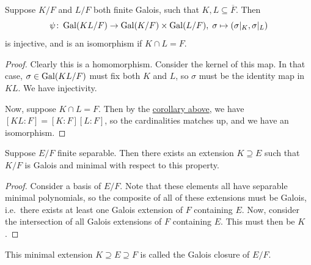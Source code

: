 \begin{theorem}\label{thm:galois-compositum-injective}
    Suppose \(K/F\) and \(L/F\) both finite Galois,
    such that \(K,L \subseteq \overline{F}\).
    Then \[\psi\colon\operatorname{Gal}(KL/F)\to\operatorname{Gal}(K/F)\times\operatorname{Gal}(L/F),\;\sigma\mapsto(\sigma\vert_K,\sigma\vert_L)\]
    is injective,
    and is an isomorphism if \(K \cap L = F\).
\end{theorem}
\begin{proof}
    Clearly this is a homomorphism.
    Consider the kernel of this map.
    In that case, \(\sigma \in \operatorname{Gal}(KL/F)\) must fix both \(K\) and \(L\),
    so \(\sigma\) must be the identity map in \(KL\).
    We have injectivity.

    Now, suppose \(K \cap L = F\).
    Then by the \hyperref[cor:galois-compositum-degree]{corollary above},
    we have \([KL:F] = [K:F][L:F]\), so the cardinalities matches up,
    and we have an isomorphism.
\end{proof}
\begin{corollary}
    Suppose \(E/F\) finite separable.
    Then there exists an extension \(K \supseteq E\) such that
    \(K/F\) is Galois and minimal with respect to this property.
\end{corollary}
\begin{proof}
    Consider a basis of \(E/F\).
    Note that these elements all have separable minimal polynomials,
    so the composite of all of these extensions must be Galois,
    i.e.\ there exists at least one Galois extension of \(F\) containing \(E\).
    Now, consider the intersection of all Galois extensions of \(F\) containing \(E\).
    This must then be \(K\).
\end{proof}
\begin{definition}
    This minimal extension \(K \supseteq E \supseteq F\) is called the Galois closure of \(E/F\).
\end{definition}

